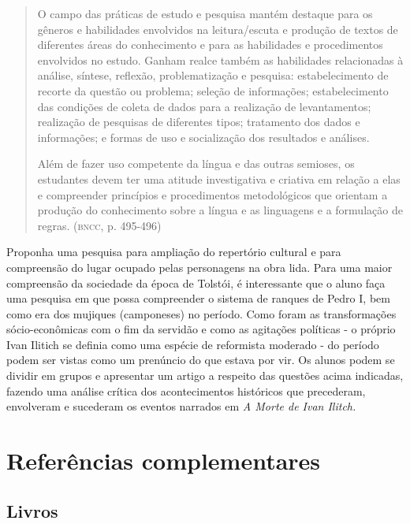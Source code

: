 \documentclass[12pt]{extarticle}
\begin{document}
\begin{quote}
O campo das práticas de estudo e pesquisa mantém destaque para os
gêneros e habilidades envolvidos na leitura/escuta e produção de textos
de diferentes áreas do conhecimento e para as habilidades e
procedimentos envolvidos no estudo. Ganham realce também as habilidades
relacionadas à análise, síntese, reflexão, problematização e pesquisa:
estabelecimento de recorte da questão ou problema; seleção de
informações; estabelecimento das condições de coleta de dados para a
realização de levantamentos; realização de pesquisas de diferentes
tipos; tratamento dos dados e informações; e formas de uso e
socialização dos resultados e análises.

Além de fazer uso competente da língua e das outras semioses, os
estudantes devem ter uma atitude investigativa e criativa em relação a
elas e compreender princípios e procedimentos metodológicos que orientam
a produção do conhecimento sobre a língua e as linguagens e a formulação
de regras. (\textsc{bncc}, p. 495-496)
\end{quote}

Proponha uma pesquisa para ampliação do repertório cultural e para
compreensão do lugar ocupado pelas personagens na obra lida. Para uma
maior compreensão da sociedade da época de Tolstói, é interessante que
o aluno faça uma pesquisa em que possa compreender o sistema de
ranques de Pedro I, bem como era dos mujiques (camponeses) no período.
Como foram as transformações sócio-econômicas com o fim da servidão e
como as agitações políticas - o próprio Ivan Ilitich se definia como
uma espécie de reformista moderado - do período podem ser vistas como
um prenúncio do que estava por vir. Os alunos podem se dividir em
grupos e apresentar um artigo a respeito das questões acima indicadas,
fazendo uma análise crítica dos acontecimentos históricos que
precederam, envolveram e sucederam os eventos narrados em \emph{A
Morte de Ivan Ilitch.}

\section{Referências complementares}

\subsection{Livros}
\end{document}
